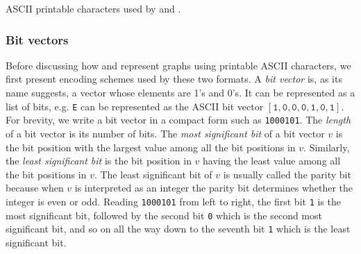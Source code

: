 \begin{table}[!htbp]
\centering

\caption{ASCII printable characters used by \graphsix and \sparsesix.}
\label{tab:graph_algorithms:graph6_sparse6_ASCII_printable_characters}
\end{table}



\subsubsection{Bit vectors}

Before discussing how \graphsix\index{\graphsix} and
\sparsesix\index{\sparsesix} represent graphs using printable
ASCII characters, we first present encoding schemes used
by these two formats. A \emph{bit vector} is, as its
name suggests, a vector whose elements are 1's and 0's. It can be
represented as a list of bits, e.g. \verb!E! can be
represented as the ASCII bit vector
$[
  \texttt{1}, \texttt{0}, \texttt{0}, \texttt{0}, \texttt{1},
  \texttt{0}, \texttt{1}
]$. For brevity, we write a bit vector in a compact form such as
\texttt{1000101}. The \emph{length} of a bit
vector is its number of bits. The
\emph{most significant bit} of a bit
vector $v$ is the bit position with the largest value among all the
bit positions in $v$. Similarly, the
\emph{least significant bit} is the bit
position in $v$ having the least value among all the bit positions in
$v$. The least significant bit of $v$ is usually called the parity
bit because when $v$ is interpreted as an integer
the parity bit determines whether the integer is even or odd. Reading
\texttt{1000101} from left to right, the first bit \texttt{1} is the
most significant bit, followed by the second bit \texttt{0} which is
the second most significant bit, and so on all the way down to the
seventh bit \texttt{1} which is the least significant bit.

